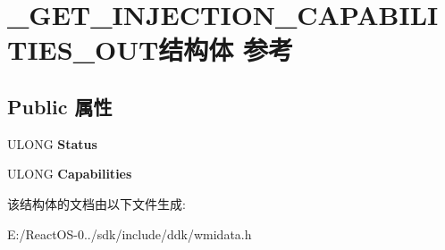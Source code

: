 \hypertarget{struct___g_e_t___i_n_j_e_c_t_i_o_n___c_a_p_a_b_i_l_i_t_i_e_s___o_u_t}{}\section{\+\_\+\+G\+E\+T\+\_\+\+I\+N\+J\+E\+C\+T\+I\+O\+N\+\_\+\+C\+A\+P\+A\+B\+I\+L\+I\+T\+I\+E\+S\+\_\+\+O\+U\+T结构体 参考}
\label{struct___g_e_t___i_n_j_e_c_t_i_o_n___c_a_p_a_b_i_l_i_t_i_e_s___o_u_t}
\subsection*{Public 属性}
\begin{DoxyCompactItemize}
\item 
\mbox{\label{struct___g_e_t___i_n_j_e_c_t_i_o_n___c_a_p_a_b_i_l_i_t_i_e_s___o_u_t_acc5f7675d62fa3617a5c28dad9c0ec15}} 
U\+L\+O\+NG {\bfseries Status}
\item 
\mbox{\label{struct___g_e_t___i_n_j_e_c_t_i_o_n___c_a_p_a_b_i_l_i_t_i_e_s___o_u_t_a32c844a34d10d6f07f54b2fa9175e5b0}} 
U\+L\+O\+NG {\bfseries Capabilities}
\end{DoxyCompactItemize}


该结构体的文档由以下文件生成\+:\begin{DoxyCompactItemize}
\item 
E\+:/\+React\+O\+S-\/0../sdk/include/ddk/wmidata.\+h\end{DoxyCompactItemize}
